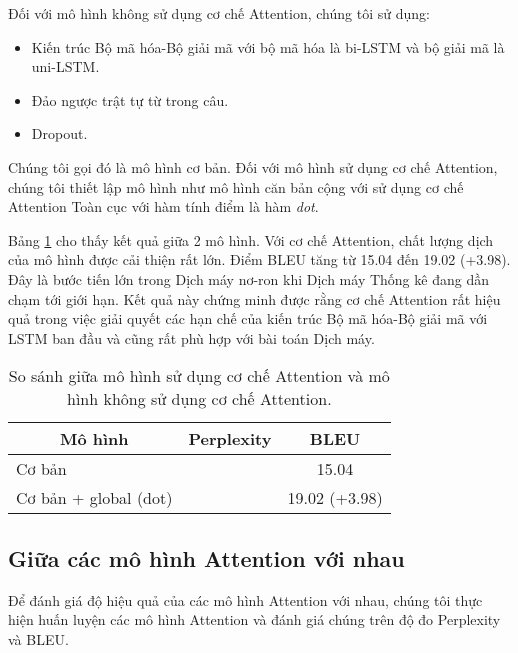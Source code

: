 Đối với mô hình không sử dụng cơ chế Attention, chúng tôi sử dụng: 
\begin{itemize}
	\item Kiến trúc Bộ mã hóa-Bộ giải mã với bộ mã hóa là bi-LSTM và bộ giải mã là uni-LSTM.
	\item Đảo ngược trật tự từ trong câu.
	\item Dropout.
\end{itemize}
Chúng tôi gọi đó là mô hình cơ bản. Đối với mô hình sử dụng cơ chế Attention, chúng tôi thiết lập mô hình như mô hình căn bản cộng với sử dụng cơ chế Attention Toàn cục với hàm tính điểm là hàm \textit{dot}.

Bảng \ref{tab_non-attn_vs_attn} cho thấy kết quả giữa 2 mô hình. Với cơ chế Attention, chất lượng dịch của mô hình được cải thiện rất lớn. Điểm BLEU tăng từ 15.04 đến 19.02 (+3.98). Đây là bước tiến lớn trong Dịch máy nơ-ron khi Dịch máy Thống kê đang dần chạm tới giới hạn. Kết quả này chứng minh được rằng cơ chế Attention rất hiệu quả trong việc giải quyết các hạn chế của kiến trúc Bộ mã hóa-Bộ giải mã với LSTM ban đầu và cũng rất phù hợp với bài toán Dịch máy.

\begin{table}
	\centering
	\begin{tabular}{|l|l|c|} 
		\hline
		\multicolumn{1}{|c|}{\textbf{Mô hình}} & \textbf{Perplexity} & \textbf{BLEU}  \\ 
		\hline
		Cơ bản                                 &                     & 15.04          \\ 
		\hline
		Cơ bản + global (dot)                  &                     & 19.02 (+3.98)  \\
		\hline
	\end{tabular}
	\caption{So sánh giữa mô hình sử dụng cơ chế Attention và mô hình không sử dụng cơ chế Attention.}
	\label{tab_non-attn_vs_attn}
\end{table}

\subsection{Giữa các mô hình Attention với nhau}
Để đánh giá độ hiệu quả của các mô hình Attention với nhau, chúng tôi thực hiện huấn luyện các mô hình Attention và đánh giá chúng trên độ đo Perplexity và BLEU. 



